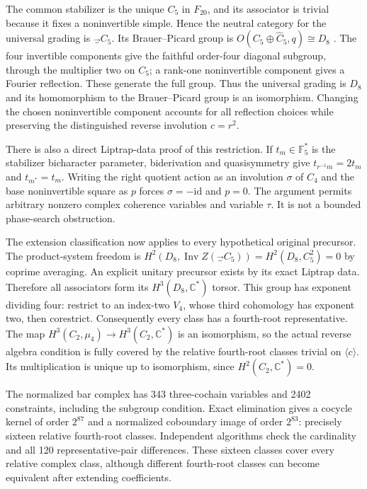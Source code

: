\documentclass[11pt]{article}
\begin{document}
The common stabilizer is the unique $C_5$ in $F_{20}$, and its associator is trivial
because it fixes a noninvertible simple. Hence the neutral category for the universal
grading is $\Vec_{C_5}$. Its Brauer--Picard group is
$O(C_5\oplus\widehat C_5,q)\cong D_8$ \cite{ENO}. The four invertible components
give the faithful order-four diagonal subgroup, through the multiplier two on
$C_5$; a rank-one noninvertible component gives a Fourier reflection. These
generate the full group. Thus the universal grading is $D_8$ and its homomorphism
to the Brauer--Picard group is an isomorphism. Changing the chosen noninvertible
component accounts for all reflection choices while preserving the distinguished
reverse involution $c=r^2$.

There is also a direct Liptrap-data proof of this restriction. If $t_m\in\mathbb F_5^*$
is the stabilizer bicharacter parameter, biderivation and quasisymmetry give
$t_{r^{-1}m}=2t_m$ and $t_{m^*}=t_m$. Writing the right quotient action as
an involution $\sigma$ of $C_4$ and the base noninvertible square as $p$ forces
$\sigma=-\mathrm{id}$ and $p=0$. The argument permits arbitrary nonzero complex
coherence variables and variable $\tau$. It is not a bounded phase-search obstruction.

The extension classification \cite{ENO} now applies to every hypothetical original
precursor. The product-system freedom is
$H^2(D_8,\operatorname{Inv}Z(\Vec_{C_5}))=H^2(D_8,C_5^2)=0$ by coprime averaging.
An explicit unitary precursor exists by its exact Liptrap data. Therefore all
associators form its $H^3(D_8,\mathbb C^*)$ torsor. This group has exponent dividing
four: restrict to an index-two $V_4$, whose third cohomology has exponent two,
then corestrict. Consequently every class has a fourth-root representative.
The map $H^3(C_2,\mu_4)\to H^3(C_2,\mathbb C^*)$ is an isomorphism, so the actual
reverse algebra condition is fully covered by the relative fourth-root classes
trivial on $\langle c\rangle$. Its multiplication is unique up to isomorphism,
since $H^2(C_2,\mathbb C^*)=0$.

The normalized bar complex has 343 three-cochain variables and 2402 constraints,
including the subgroup condition. Exact elimination gives a cocycle kernel of
order $2^{87}$ and a normalized coboundary image of order $2^{83}$: precisely
sixteen relative fourth-root classes. Independent algorithms check the cardinality
and all 120 representative-pair differences. These sixteen classes cover every
relative complex class, although different fourth-root classes can become equivalent
after extending coefficients.
\end{document}

